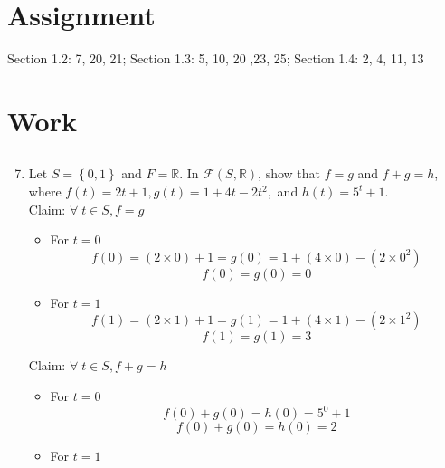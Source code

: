 \documentclass[letterpaper,12pt]{article}
\newcommand{\gap}{\vspace*{0.01cm}}
\newcommand{\?}{\stackrel{?}{=}}
\begin{document}
\gap
\begin{spacing}{1.5}
\section{Assignment}
Section 1.2: 7, 20, 21; Section 1.3: 5, 10, 20 ,23, 25; 
Section 1.4: 2, 4, 11, 13
\section{Work}
\setcounter{section}{1}
\setcounter{subsection}{1}
\subsection{}
\begin{enumerate}
\setcounter{enumi}{6}
\item Let $S = \left\{0,1\right\}$ and $F = \mathbb{R}$. In
  $\mathcal{F}\left(S,\mathbb{R}\right)$, show that $f = g$ and $f + g = h$,
  where $f(t) = 2t + 1, g(t) = 1 + 4t -2t^2,$ and $ h(t) = 5^t +1$.
\\
Claim: $\forall\; t \in S, f = g$
\begin{itemize}
\item For $t=0$
\begin{equation}
f(0) = \left(2 \times 0\right) + 1 = g(0) = 1 + \left(4 \times 0\right) - \left(2\times 0^2\right)
\end{equation}
\begin{equation}
f(0) = g(0) = 0
\end{equation}
\item For $t=1$
\begin{equation}
f(1) = \left(2 \times 1\right) + 1 = g(1) = 1 + \left(4 \times 1\right) - \left(2\times 1^2\right)
\end{equation}
\begin{equation}
f(1) = g(1) = 3
\end{equation}
\end{itemize}
Claim: $\forall\; t \in S, f + g = h$
\begin{itemize}
\item For $t=0$
\begin{equation}
f(0) + g(0) = h(0) = 5^0 + 1
\end{equation}
\begin{equation}
f(0) + g(0) = h(0) = 2
\end{equation}
\item For $t=1$
\begin{equation}

\end{equation}
\end{itemize}
\end{enumerate}
\end{spacing}
\end{document}
